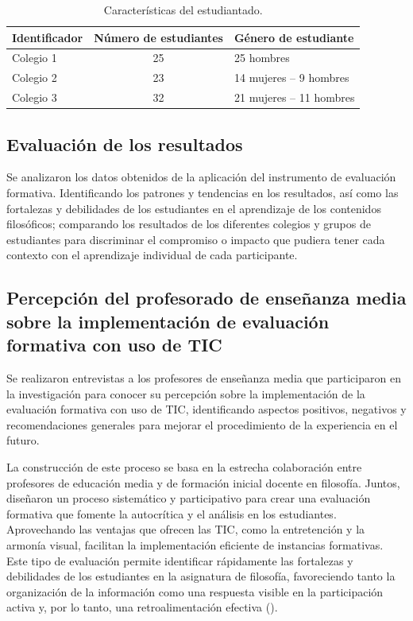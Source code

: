 \documentclass[spanish]{textolivre}
\begin{document}
\begin{table}[h!]
\centering
\begin{threeparttable}
\caption{Características del estudiantado.}\label{tab-3}
\begin{tabular}{lcl}
\toprule
Identificador & Número de estudiantes & Género de estudiante \\
\midrule
Colegio 1 & 25 & 25 hombres \\
Colegio 2 & 23 & 14 mujeres -- 9 hombres \\
Colegio 3 & 32 & 21 mujeres -- 11 hombres \\
\bottomrule
\end{tabular}
\end{threeparttable}
\end{table}

\subsection{Evaluación de los resultados}
Se analizaron los datos obtenidos de la aplicación del instrumento de evaluación formativa. Identificando los patrones y tendencias en los resultados, así como las fortalezas y debilidades de los estudiantes en el aprendizaje de los contenidos filosóficos; comparando los resultados de los diferentes colegios y grupos de estudiantes para discriminar el compromiso o impacto que pudiera tener cada contexto con el aprendizaje individual de cada participante.

\subsection{Percepción del profesorado de enseñanza media sobre la implementación de evaluación formativa con uso de TIC}
Se realizaron entrevistas a los profesores de enseñanza media que participaron en la investigación para conocer su percepción sobre la implementación de la evaluación formativa con uso de TIC, identificando aspectos positivos, negativos y recomendaciones generales para mejorar el procedimiento de la experiencia en el futuro. 

La construcción de este proceso se basa en la estrecha colaboración entre profesores de educación media y de formación inicial docente en filosofía. Juntos, diseñaron un proceso sistemático y participativo para crear una evaluación formativa que fomente la autocrítica y el análisis en los estudiantes. Aprovechando las ventajas que ofrecen las TIC, como la entretención y la armonía visual, facilitan la implementación eficiente de instancias formativas. Este tipo de evaluación permite identificar rápidamente las fortalezas y debilidades de los estudiantes en la asignatura de filosofía, favoreciendo tanto la organización de la información como una respuesta visible en la participación activa y, por lo tanto, una retroalimentación efectiva ().
\end{document}
